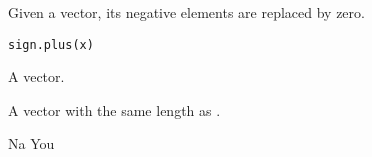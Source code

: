 \begin{Description}\relax
Given a vector, its negative elements are replaced by zero.
\end{Description}
\begin{Usage}
\begin{verbatim}
sign.plus(x)
\end{verbatim}
\end{Usage}
\begin{Arguments}
\begin{ldescription}
\item[\code{x}] A vector.

\end{ldescription}
\end{Arguments}
\begin{Value}
A vector with the same length as .
\end{Value}
\begin{Author}\relax
Na You
\end{Author}

